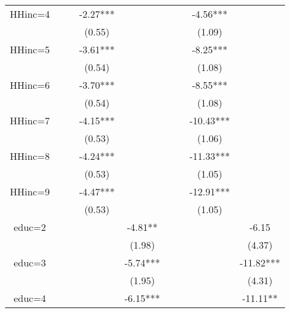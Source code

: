 \documentclass[12pt,notitlepage,onecolumn,aps,pra]{article}
\begin{document}
\begin{table}[ht]
\begin{adjustbox}{width={0.9\textwidth},totalheight={\textheight}}
\begin{threeparttable}
\begin{tabular}{ccccccccc}
HHinc=4      &          &           &   -2.27*** &             &           &            &    -4.56*** &              \\
             &          &           &     (0.55) &             &           &            &      (1.09) &              \\
HHinc=5      &          &           &   -3.61*** &             &           &            &    -8.25*** &              \\
             &          &           &     (0.54) &             &           &            &      (1.08) &              \\
HHinc=6      &          &           &   -3.70*** &             &           &            &    -8.55*** &              \\
             &          &           &     (0.54) &             &           &            &      (1.08) &              \\
HHinc=7      &          &           &   -4.15*** &             &           &            &   -10.43*** &              \\
             &          &           &     (0.53) &             &           &            &      (1.06) &              \\
HHinc=8      &          &           &   -4.24*** &             &           &            &   -11.33*** &              \\
             &          &           &     (0.53) &             &           &            &      (1.05) &              \\
HHinc=9      &          &           &   -4.47*** &             &           &            &   -12.91*** &              \\
             &          &           &     (0.53) &             &           &            &      (1.05) &              \\
educ=2       &          &           &            &     -4.81** &           &            &             &        -6.15 \\
             &          &           &            &      (1.98) &           &            &             &       (4.37) \\
educ=3       &          &           &            &    -5.74*** &           &            &             &    -11.82*** \\
             &          &           &            &      (1.95) &           &            &             &       (4.31) \\
educ=4       &          &           &            &    -6.15*** &           &            &             &     -11.11** \\

\end{tabular}
\end{threeparttable}
\end{adjustbox}
\end{table}
\end{document}
